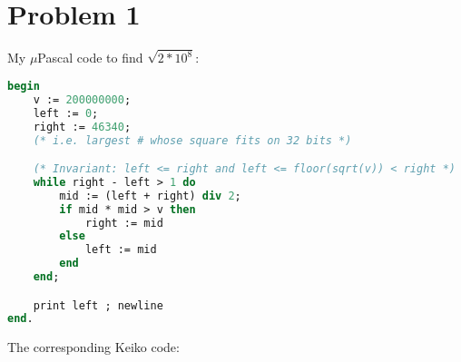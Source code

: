 \section{Problem 1}

My $\mu$Pascal code to find $\sqrt{2 * 10^8}$:

\begin{lstlisting}[language=Pascal]
begin
    v := 200000000;
    left := 0;
    right := 46340;
    (* i.e. largest # whose square fits on 32 bits *)

    (* Invariant: left <= right and left <= floor(sqrt(v)) < right *)
    while right - left > 1 do
        mid := (left + right) div 2;
        if mid * mid > v then
            right := mid
        else
            left := mid
        end
    end;

    print left ; newline
end.
\end{lstlisting}

\noindent
The corresponding Keiko code: \\

